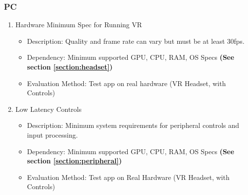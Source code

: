 \documentclass[a4paper,10pt]{article}
\begin{document}
	\subsubsection{PC}
		\begin{enumerate}
			\item Hardware Minimum Spec for Running VR
			\begin{itemize}
				\item Description: Quality and frame rate can vary but must be at least 30fps.
				\item Dependency: Minimum supported GPU, CPU, RAM, OS Specs \textbf{(See section \ref{section:headset})}
				\item Evaluation Method: Test app on real hardware (VR Headset, with Controls)
			\end{itemize}
			\item Low Latency Controls
			\begin{itemize}
				\item Description: Minimum system requirements for peripheral controls and input processing.
				\item Dependency: Minimum supported GPU, CPU, RAM, OS Specs \textbf{(See section \ref{section:peripheral})}
				\item Evaluation Method: Test app on Real Hardware (VR Headset, with Controls)
			\end{itemize}
		\end{enumerate}
\end{document}
